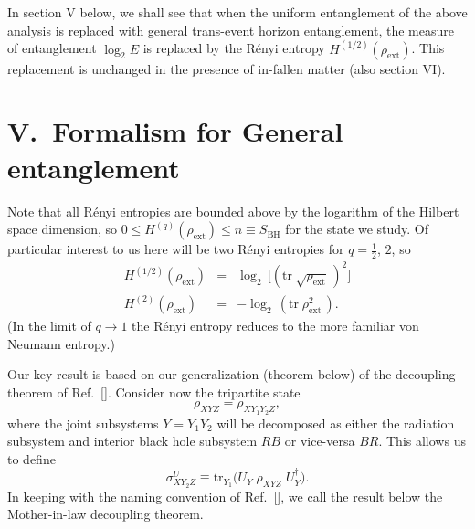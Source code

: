 \documentclass[aps,showpacs,prl,12pt]{revtex4}
\begin{document}
In section V below, we shall see that when the uniform entanglement of
the above analysis is replaced with general trans-event horizon
entanglement, the measure of entanglement $\log_2 E$ is replaced by
the R\'enyi entropy $H^{(1/2)}(\rho_{\text{ext}})$. This replacement
is unchanged in the presence of in-fallen matter (also section VI).

\section{V.\ Formalism for General entanglement}
\label{decoupling}

Note that all R\'enyi entropies are bounded above by the logarithm of
the Hilbert space dimension, so
 $0\le H^{(q)}(\rho_{\text{ext}})\le n\equiv S_{\text{BH}}$
for the state we study. Of particular interest to us here will be two
R\'enyi entropies for $q=\frac{1}{2}$, $2$, so
\begin{eqnarray}
H^{(1/2)}(\rho_{\text{ext}}) &=&\log_2
 \,\bigl[({\text{tr}}\;\sqrt{\rho_{\text{ext}}}\,)^2\bigr] \nonumber \\
H^{(2)}(\rho_{\text{ext}}) &=&-\log_2
\,({\text{tr}}\;{\rho^2_{\text{ext}}}\,).
\end{eqnarray}
(In the limit of $q\rightarrow 1$ the R\'enyi entropy reduces to the
more familiar von Neumann entropy.)

Our key result is based on our generalization (theorem below) of the
decoupling theorem of Ref.~[]. Consider now the
tripartite state
\begin{equation}
\rho_{XYZ}^{\text{~}}=
\rho_{XY_1Y_2Z}^{\text{~}},
\end{equation}
where the joint subsystems $Y=Y_1Y_2$ will be decomposed as either
the radiation subsystem and interior black hole subsystem $RB$ or vice-versa
$BR$. This allows us to define
\begin{equation}
\sigma_{XY_2Z}^U\equiv
\text{tr}_{Y_1}^{\text{~}} \bigl(U_{Y}\;
\rho_{XYZ}^{\text{~}}\; U_{Y}^\dagger\bigr).
\end{equation}
In keeping with the naming convention of Ref.~[],
we call the result below the Mother-in-law decoupling theorem.

\end{document}
